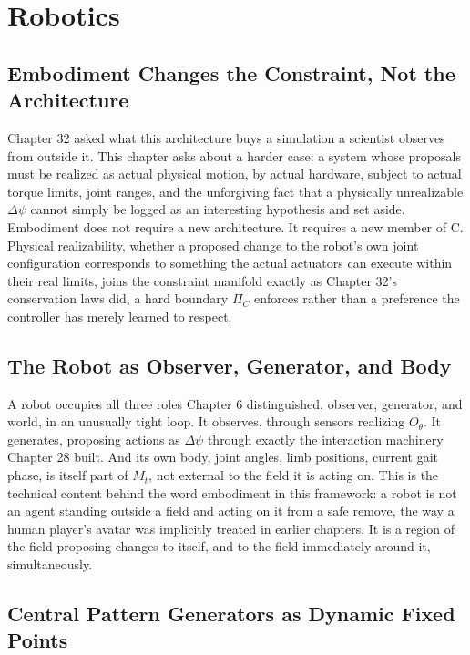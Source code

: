 \chapter{Robotics}

\section{Embodiment Changes the Constraint, Not the Architecture}

Chapter 32 asked what this architecture buys a simulation a scientist observes from outside it. This chapter asks about a harder case: a system whose proposals must be realized as actual physical motion, by actual hardware, subject to actual torque limits, joint ranges, and the unforgiving fact that a physically unrealizable \(\Delta\psi\) cannot simply be logged as an interesting hypothesis and set aside. Embodiment does not require a new architecture. It requires a new member of C. Physical realizability, whether a proposed change to the robot's own joint configuration corresponds to something the actual actuators can execute within their real limits, joins the constraint manifold exactly as Chapter 32's conservation laws did, a hard boundary \(\Pi_C\) enforces rather than a preference the controller has merely learned to respect.

\section{The Robot as Observer, Generator, and Body}

A robot occupies all three roles Chapter 6 distinguished, observer, generator, and world, in an unusually tight loop. It observes, through sensors realizing \(O_\theta\). It generates, proposing actions as \(\Delta\psi\) through exactly the interaction machinery Chapter 28 built. And its own body, joint angles, limb positions, current gait phase, is itself part of \(M_t\), not external to the field it is acting on. This is the technical content behind the word embodiment in this framework: a robot is not an agent standing outside a field and acting on it from a safe remove, the way a human player's avatar was implicitly treated in earlier chapters. It is a region of the field proposing changes to itself, and to the field immediately around it, simultaneously.

\section{Central Pattern Generators as Dynamic Fixed Points}

